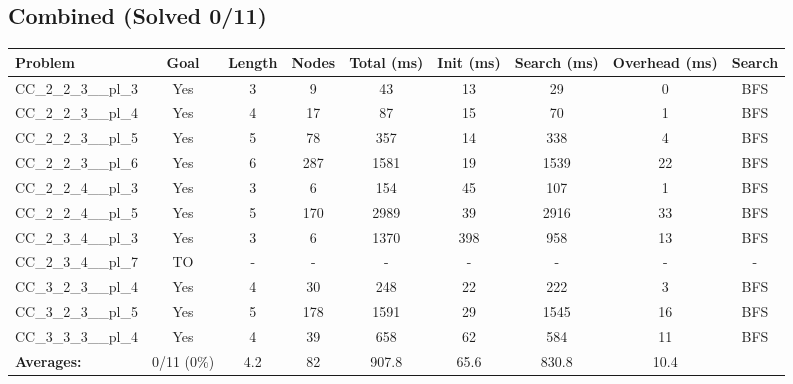 \documentclass{article}
\begin{document}
\subsection*{Combined (Solved 0/11)}
\begin{tabular}{lcccccccc}
\toprule
Problem & Goal & Length & Nodes & Total (ms) & Init (ms) & Search (ms) & Overhead (ms) & Search \\
\midrule
CC\_2\_2\_3\_\_pl\_3 & Yes & 3 & 9 & 43 & 13 & 29 & 0 & BFS \\
CC\_2\_2\_3\_\_pl\_4 & Yes & 4 & 17 & 87 & 15 & 70 & 1 & BFS \\
CC\_2\_2\_3\_\_pl\_5 & Yes & 5 & 78 & 357 & 14 & 338 & 4 & BFS \\
CC\_2\_2\_3\_\_pl\_6 & Yes & 6 & 287 & 1581 & 19 & 1539 & 22 & BFS \\
CC\_2\_2\_4\_\_pl\_3 & Yes & 3 & 6 & 154 & 45 & 107 & 1 & BFS \\
CC\_2\_2\_4\_\_pl\_5 & Yes & 5 & 170 & 2989 & 39 & 2916 & 33 & BFS \\
CC\_2\_3\_4\_\_pl\_3 & Yes & 3 & 6 & 1370 & 398 & 958 & 13 & BFS \\
CC\_2\_3\_4\_\_pl\_7 & TO & - & - & - & - & - & - & - \\
CC\_3\_2\_3\_\_pl\_4 & Yes & 4 & 30 & 248 & 22 & 222 & 3 & BFS \\
CC\_3\_2\_3\_\_pl\_5 & Yes & 5 & 178 & 1591 & 29 & 1545 & 16 & BFS \\
CC\_3\_3\_3\_\_pl\_4 & Yes & 4 & 39 & 658 & 62 & 584 & 11 & BFS \\
\textbf{Averages:} & 0/11 (0\%) & 4.2 & 82 & 907.8 & 65.6 & 830.8 & 10.4 & \\
\bottomrule
\end{tabular}
\\[0.7cm]
\end{document}
